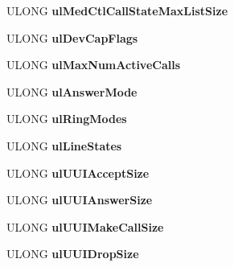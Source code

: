 \begin{DoxyCompactItemize}
U\+L\+O\+NG {\bfseries ul\+Med\+Ctl\+Call\+State\+Max\+List\+Size}
\item 
\mbox{\label{struct___l_i_n_e___d_e_v___c_a_p_s_a81641de2c116e3b634c032dbdc9ee56f}} 
U\+L\+O\+NG {\bfseries ul\+Dev\+Cap\+Flags}
\item 
\mbox{\label{struct___l_i_n_e___d_e_v___c_a_p_s_ac15e5f0937e4487e4e077166656e103b}} 
U\+L\+O\+NG {\bfseries ul\+Max\+Num\+Active\+Calls}
\item 
\mbox{\label{struct___l_i_n_e___d_e_v___c_a_p_s_a236e93092f87c472d5a57473ab93306b}} 
U\+L\+O\+NG {\bfseries ul\+Answer\+Mode}
\item 
\mbox{\label{struct___l_i_n_e___d_e_v___c_a_p_s_a7766b5504b18e2714c2f9b81d2e2891f}} 
U\+L\+O\+NG {\bfseries ul\+Ring\+Modes}
\item 
\mbox{\label{struct___l_i_n_e___d_e_v___c_a_p_s_afc5973dcaebd1922bdf68f4811fd03a9}} 
U\+L\+O\+NG {\bfseries ul\+Line\+States}
\item 
\mbox{\label{struct___l_i_n_e___d_e_v___c_a_p_s_a1d5bbb60b1232a0c52e8d1cd436d89ef}} 
U\+L\+O\+NG {\bfseries ul\+U\+U\+I\+Accept\+Size}
\item 
\mbox{\label{struct___l_i_n_e___d_e_v___c_a_p_s_a699742199811ef3519ca587f8d3c1edd}} 
U\+L\+O\+NG {\bfseries ul\+U\+U\+I\+Answer\+Size}
\item 
\mbox{\label{struct___l_i_n_e___d_e_v___c_a_p_s_ad8f84441033b8b0c549df09288116ab8}} 
U\+L\+O\+NG {\bfseries ul\+U\+U\+I\+Make\+Call\+Size}
\item 
\mbox{\label{struct___l_i_n_e___d_e_v___c_a_p_s_ac19ece8069ea09ef00fbb02b446217fc}} 
U\+L\+O\+NG {\bfseries ul\+U\+U\+I\+Drop\+Size}
\item 
\mbox{\label{struct___l_i_n_e___d_e_v___c_a_p_s_a3ca4adf9fdd079fcb5d5a25c5a8d0141}} 

\end{DoxyCompactItemize}
